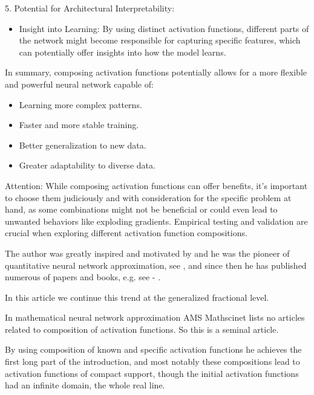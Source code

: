 \documentclass[10pt]{NSP1}
\numberwithin{equation}{section}
\begin{document}
5. Potential for Architectural Interpretability:

\begin{itemize}
\item Insight into Learning: By using distinct activation functions,
different parts of the network might become responsible for capturing
specific features, which can potentially offer insights into how the model
learns.
\end{itemize}

In summary, composing activation functions potentially allows for a more
flexible and powerful neural network capable of:

\begin{itemize}
\item Learning more complex patterns.

\item Faster and more stable training.

\item Better generalization to new data.

\item Greater adaptability to diverse data.
\end{itemize}

Attention: While composing activation functions can offer benefits, it's
important to choose them judiciously and with consideration for the specific
problem at hand, as some combinations might not be beneficial or could even
lead to unwanted behaviors like exploding gradients. Empirical testing and
validation are crucial when exploring different activation function
compositions.

The author was greatly inspired and motivated by \cite{8} and he was the
pioneer of quantitative neural network approximation, see \cite{2}, and
since then he has published numerous of papers and books, e.g. see \cite{3}-
\cite{7}.

In this article we continue this trend at the generalized fractional level.

In mathematical neural network approximation AMS Mathscinet lists no
articles related to composition of activation functions. So this is a
seminal article.

By using composition of known and specific activation functions he achieves
the first long part of the introduction, and most notably these compositions
lead to activation functions of compact support, though the initial
activation functions had an infinite domain, the whole real line.
\end{document}
